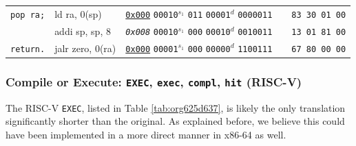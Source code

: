 \documentclass[a4paper,12pt,final]{article}
\begin{document}
\begin{table}[!htbp]
\begin{adjustwidth}{-1cm}{-1cm}
\begin{center}
\begin{tabular}{l|ll|l|l}
\hspace{1.053000em} \texttt{pop ra;} & ld ra, 0(sp) & \uline{\texttt{0x000}}                    \texttt{00010}​\(^{s_{1}}\) \texttt{011} \texttt{00001}​\(^{d}\)  \texttt{0000011} &  & \texttt{83 30 01 00}\\[0pt]
\hspace{1.053000em} & addi sp, sp, 8 & \emph{\texttt{0x008}}                    \texttt{00010}​\(^{s_{1}}\) \texttt{000} \texttt{00010}​\(^{d}\)  \texttt{0010011} &  & \texttt{13 01 81 00}\\[0pt]
\hspace{1.053000em} \texttt{return.} & jalr zero, 0(ra) & \uline{\texttt{0x000}}                    \texttt{00001}​\(^{s_{1}}\) \texttt{000} \texttt{00000}​\(^{d}\)  \texttt{1100111} &  & \texttt{67 80 00 00}\\[0pt]
\end{tabular}

\end{center}
\normalsize \end{adjustwidth} \end{table} \vspace{0}
\pagebreak

\subsubsection{Compile or Execute: \texttt{EXEC}, \texttt{exec}, \texttt{compl}, \texttt{hit} (RISC-V)}
\label{sec:orge39408c}

The RISC-V \texttt{EXEC}, listed in Table \ref{tab:org625d637}, is likely the
only translation significantly shorter than the original.  As
explained before, we believe this could have been implemented in a
more direct manner in x86-64 as well.
\end{document}
